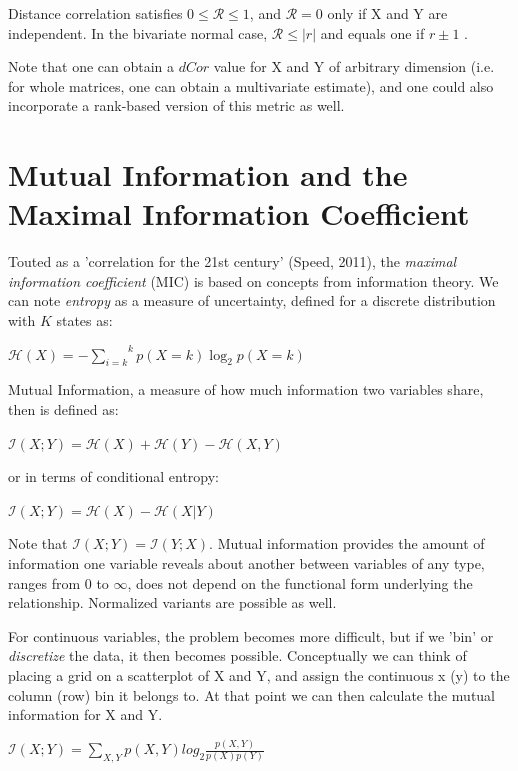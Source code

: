 \documentclass[english,nohyper,titlepage]{tufte-handout}\usepackage{graphicx, color}
\begin{document}
\medskip
Distance correlation satisfies $0 \leq \mathcal{R} \leq 1$, and $\mathcal{R} = 0$ only if X and Y are independent. In the bivariate normal case, $\mathcal{R} \leq |r|$ and equals one if $r\pm 1$ .

Note that one can obtain a $dCor$ value for X and Y of arbitrary dimension (i.e. for whole matrices, one can obtain a multivariate estimate), and one could also incorporate a rank-based version of this metric as well.

\section{Mutual Information and the Maximal Information Coefficient}
Touted as a 'correlation for the 21st century' (Speed, 2011), the \emph{maximal information coefficient} (MIC) is based on concepts from information theory.  We can note \emph{entropy} as a measure of uncertainty, defined for a discrete distribution with $K$ states as:

\medskip
$\mathcal{H}(X)=-\overset{k}{\underset{i=k}{\sum}} p(X=k)\log_2 p(X=k)$ 
\medskip

Mutual Information, a measure of how much information two variables share, then is defined as: 
\medskip

$\mathcal{I}(X;Y)=\mathcal{H}(X)+\mathcal{H}(Y)-\mathcal{H}(X,Y)$
\medskip

or in terms of conditional entropy:
\medskip

$\mathcal{I}(X;Y)=\mathcal{H}(X)-\mathcal{H}(X|Y)$
\medskip

Note that $\mathcal{I}(X;Y) = \mathcal{I}(Y;X)$. Mutual information provides the amount of information one variable reveals about another between variables of any type, ranges from 0 to $\infty$, does not depend on the functional form underlying the relationship.  Normalized variants are possible as well.

For continuous variables, the problem becomes more difficult, but if we 'bin' or \emph{discretize} the data, it then becomes possible. Conceptually we can think of placing a grid on a scatterplot of X and Y, and assign the continuous x (y) to the column (row) bin it belongs to.  At that point we can then calculate the mutual information for X and Y.
\medskip

$\mathcal{I}(X;Y)=\underset{X,Y}{\sum}p(X,Y)log_2\frac{p(X,Y)}{p(X)p(Y)}$
\medskip
\end{document}
